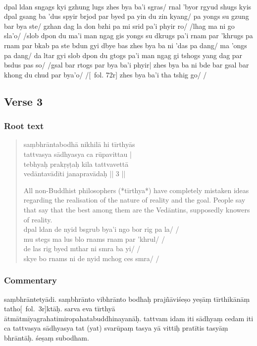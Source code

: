 \documentclass[12pt]{article}
\begin{document}
\textbf{\TVB}\\
dpal ldan sngags kyi gzhung lugs zhes bya ba'i sgras/ rnal 'byor rgyud shugs kyis dpal gsang ba 'dus spyir brjod par byed pa yin du zin kyang/ pa yongs su gzung bar bya ste/ gzhan dag la don bzhi pa mi srid pa'i phyir ro/ /lhag ma ni go sla'o/ /slob dpon du ma'i man ngag gis yongs su dkrugs pa'i rnam par 'khrugs pa rnam par bkab pa ste bdun gyi dbye bas zhes bya ba ni 'das pa dang/ ma 'ongs pa dang/ da ltar gyi slob dpon du gtogs pa'i man ngag gi tshogs yang dag par bsdus pas so/ /gsal bar rtogs par bya ba'i phyir| zhes bya ba ni bde bar gsal bar khong du chud par bya'o/ /[\TVB\ fol. 72r] zhes bya ba'i tha tshig go/ /

\subsection{Verse 3}
\subsubsection{Root text}
\begin{quote}
	saṃbhrāntabodhā nikhilā hi tīrthyās \\%
	tattvasya sādhyasya ca rūpavittau |\\
	tebhyaḥ prakṛṣṭaḥ kila tattvavettā\\
	vedāntavādīti janapravādaḥ || 3 ||

	All non-Buddhist philosophers (*tīrthya*) have completely mistaken ideas regarding the realisation of the nature of reality and the goal.
	People say that say that the best among them are the Vedāntins, supposedly knowers of reality.\\

	dpal ldan de nyid bsgrub bya'i ngo bor rig pa la/ /\\
	mu stegs ma lus blo rnams rnam par 'khrul/ /\\
	de las rig byed mthar ni smra ba yi/ /\\
	skye bo rnams ni de nyid mchog ces smra/ /
\end{quote}

\subsubsection{Commentary}
saṃbhrāntetyādi.
saṃbhrānto vibhrānto bodhaḥ prajñāviśeṣo yeṣāṃ tīrthikānāṃ tatho[\MS\ fol.\ 3r]ktāḥ.
sarva eva tīrthyā ātmātmīyagrahatimiropahatabuddhinayanāḥ.
tattvam idam iti sādhyaṃ cedam iti ca tattvasya sādhyasya tat (yat) svarūpaṃ tasya yā vittiḥ pratītis tasyāṃ bhrāntāḥ.
śeṣaṃ subodham.\\
\end{document}
